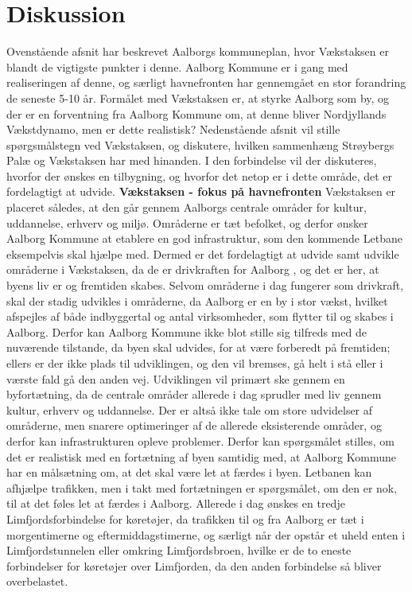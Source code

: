 \section{Diskussion}
Ovenstående afsnit har beskrevet Aalborgs kommuneplan, hvor Vækstaksen er blandt de vigtigste punkter i denne. Aalborg Kommune er i gang med realiseringen af denne, og særligt havnefronten har gennemgået en stor forandring de seneste 5-10 år. 
\newline \indent{     }  Formålet med Vækstaksen er, at styrke Aalborg som by, og der er en forventning fra Aalborg Kommune om, at denne bliver Nordjyllands Vækstdynamo, men er dette realistisk? Nedenstående afsnit vil stille spørgsmålstegn ved Vækstaksen, og diskutere, hvilken sammenhæng Strøybergs Palæ og Vækstaksen har med hinanden. I den forbindelse vil der diskuteres, hvorfor der ønskes en tilbygning, og hvorfor det netop er i dette område, det er fordelagtigt at udvide.
\newline
\newline
\textbf{Vækstaksen - fokus på havnefronten}
\newline
Vækstaksen er placeret således, at den går gennem Aalborgs centrale områder for kultur, uddannelse, erhverv og miljø. Områderne er tæt befolket, og derfor ønsker Aalborg Kommune at etablere en god infrastruktur, som den kommende Letbane eksempelvis skal hjælpe med. Dermed er det fordelagtigt at udvide samt udvikle områderne i Vækstaksen, da de er drivkraften for Aalborg \citep{bedreoverblik}, og det er her, at byens liv er og fremtiden skabes. Selvom områderne i dag fungerer som drivkraft, skal der stadig udvikles i områderne, da Aalborg er en by i stor vækst, hvilket afspejles af både indbyggertal og antal virksomheder, som flytter til og skabes i Aalborg. Derfor kan Aalborg Kommune ikke blot stille sig tilfreds med de nuværende tilstande, da byen skal udvides, for at være forberedt på fremtiden; ellers er der ikke plads til udviklingen, og den vil bremses, gå helt i stå eller i værste fald gå den anden vej.
\newline \indent{     }  Udviklingen vil primært ske gennem en byfortætning, da de centrale områder allerede i dag sprudler med liv gennem kultur, erhverv og uddannelse. Der er altså ikke tale om store udvidelser af områderne, men snarere optimeringer af de allerede eksisterende områder, og derfor kan infrastrukturen opleve problemer. Derfor kan spørgsmålet stilles, om det er realistisk med en fortætning af byen samtidig med, at Aalborg Kommune har en målsætning om, at det skal være let at færdes i byen. Letbanen kan afhjælpe trafikken, men i takt med fortætningen er spørgsmålet, om den er nok, til at det føles let at færdes i Aalborg. Allerede i dag ønskes en tredje Limfjordsforbindelse for køretøjer, da trafikken til og fra Aalborg er tæt i morgentimerne og eftermiddagstimerne, og særligt når der opstår et uheld enten i Limfjordstunnelen eller omkring Limfjordsbroen, hvilke er de to eneste forbindelser for køretøjer over Limfjorden, da den anden forbindelse så bliver overbelastet. 

